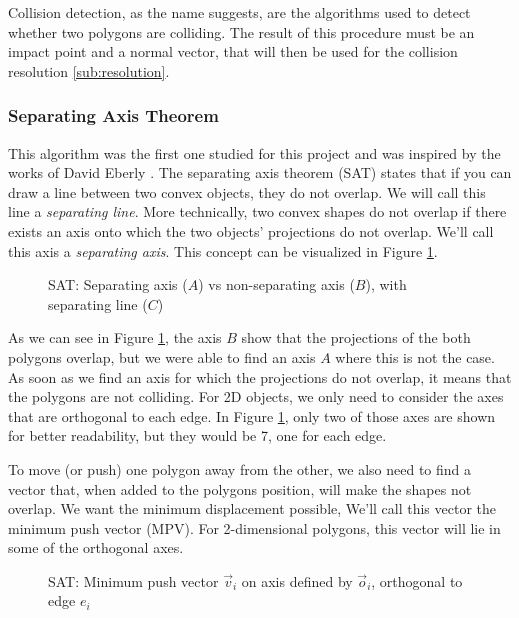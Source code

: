 Collision detection, as the name suggests, are the algorithms used to detect
whether two polygons are colliding. The result of this procedure must be an
impact point and a normal vector, that will then be used for the  collision
resolution \ref{sub:resolution}.

\subsubsection{Separating Axis Theorem}

This algorithm was the first one studied for this project and was inspired by
the works of David Eberly \cite{convexcollisionsSAT}. The separating axis
theorem (SAT) states that if you can draw a line between two convex objects,
they do not overlap. We will call this line a \textit{separating line}. More
technically, two convex shapes do not overlap if there exists an axis onto which
the two objects' projections do not overlap. We'll call this axis a \textit{separating
	axis}. This concept can be visualized in Figure \ref{fig:SAT-intro}.

\begin{figure}[H]
	\centering
	\caption{SAT: Separating axis ($A$) vs non-separating axis ($B$), with
		separating line ($C$)}
	\label{fig:SAT-intro}
\end{figure}

As we can see in Figure \ref{fig:SAT-intro}, the axis $B$ show that the
projections of the both polygons overlap, but we were able to find an axis $A$
where this is not the case. As soon as we find an axis for which the projections
do not overlap, it means that the polygons are not colliding. For 2D objects, we
only need to consider the axes that are orthogonal to each edge. In Figure
\ref{fig:SAT-intro}, only two of those axes are shown for better readability,
but they would be 7, one for each edge.

To move (or push) one polygon away from the other, we also need to find a vector
that, when added to the polygons position, will make the shapes not overlap. We
want the minimum displacement possible, We'll call this vector the minimum push
vector (MPV). For 2-dimensional polygons, this vector will lie in some of the
orthogonal axes.

\begin{figure}[H]
	\centering
	\caption{SAT: Minimum push vector $\vec v_i$ on axis defined by $\vec o_i$,
		orthogonal to edge $e_i$}
	\label{fig:SAT-mpv}
\end{figure}

